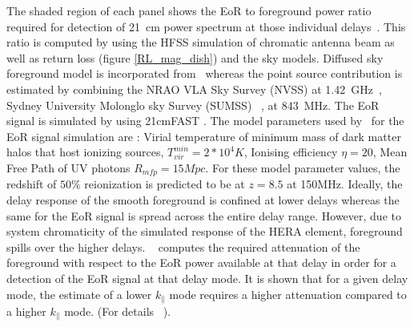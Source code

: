 \documentclass[twocolumn]{emulateapj}
\begin{document}
The shaded region of each panel shows the EoR to foreground power ratio required for detection of 21~cm power spectrum at those individual delays~\citep{Thyagarajan_et_al2016}. This ratio is computed by using the HFSS simulation of chromatic antenna beam as well as return loss (figure \ref{RL_mag_dish}) and the sky models. Diffused sky foreground model is incorporated from~\citep{deolivieracosta_et_al2008} whereas the point source contribution is estimated by combining the NRAO VLA Sky Survey (NVSS) at 1.42~GHz~\citep{Condon_1998}, Sydney University Molonglo sky Survey (SUMSS) ~\citep{Bock_et_al_1999}, \citep{Mauch_et_al_2003} at 843~MHz. The EoR signal is simulated by using 21cmFAST \citep{Messinger_et_al2011}. The model parameters used by~\cite{Thyagarajan_et_al2016} for the EoR signal simulation are : Virial temperature of minimum mass of dark matter halos that host ionizing sources, $T_{vir}^{min} = 2*10^4 K$, Ionising efficiency $\eta = 20$, Mean Free Path of UV photons $R_{mfp} = 15Mpc.$ For these model parameter values, the redshift of $50\%$ reionization is predicted to be at $z = 8.5$ at 150MHz.
Ideally, the delay response of the smooth foreground is confined at lower delays whereas the same for the EoR signal is spread across the entire delay range. However, due to system chromaticity of the simulated response of the HERA element, foreground spills over the higher delays. ~\cite{Thyagarajan_et_al2016} computes the required attenuation of the foreground with respect to the EoR power available at that delay in order for a detection of the EoR signal at that delay mode. It is shown that for a given delay mode, the estimate of a lower $k_{\parallel}$ mode requires a higher  attenuation compared to a higher $k_{\parallel}$ mode. (For details ~\cite{Thyagarajan_et_al2016}). 
\end{document}
